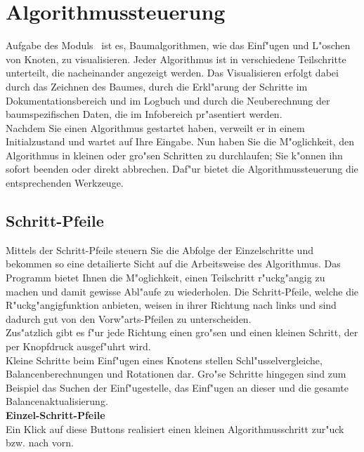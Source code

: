 
\section{Algorithmussteuerung}

Aufgabe des Moduls \AVL \ ist es, Baumalgorithmen, wie das Einf"ugen und L"oschen von Knoten, zu visualisieren.
Jeder Algorithmus ist in verschiedene Teilschritte unterteilt, die nacheinander angezeigt werden. Das Visualisieren
erfolgt dabei durch das Zeichnen des Baumes, durch die Erkl"arung der Schritte im Dokumentationsbereich und im Logbuch und durch die 
Neuberechnung der baumspezifischen Daten, die im Infobereich pr"asentiert werden.
\\
Nachdem Sie einen Algorithmus gestartet haben, verweilt er in einem Initialzustand und wartet auf Ihre Eingabe. 
Nun haben Sie die M"oglichkeit, den Algorithmus in kleinen oder gro"sen Schritten zu durchlaufen; Sie k"onnen ihn sofort
beenden oder direkt abbrechen. Daf"ur bietet die Algorithmussteuerung die entsprechenden Werkzeuge. \\


\subsection{Schritt-Pfeile}

Mittels der Schritt-Pfeile steuern Sie die Abfolge der Einzelschritte und bekommen so eine detailierte Sicht
auf die Arbeitsweise des Algorithmus. Das Programm bietet Ihnen die M"oglichkeit, einen Teilschritt r"uckg"angig 
zu machen und damit gewisse Abl"aufe zu wiederholen. Die Schritt-Pfeile, welche die R"uckg"angigfunktion anbieten, weisen
in ihrer Richtung nach links und sind dadurch gut von den Vorw"arts-Pfeilen zu unterscheiden. \\
Zus"atzlich gibt es f"ur jede Richtung einen gro"sen und einen kleinen Schritt, der per Knopfdruck ausgef"uhrt wird. \\

Kleine Schritte beim Einf"ugen eines Knotens stellen Schl"usselvergleiche, Balancenberechnungen und
Rotationen dar. Gro"se Schritte hingegen sind zum Beispiel das Suchen der Einf"ugestelle, das Einf"ugen an dieser und 
die gesamte Balancenaktualisierung. \\

\medskip
{} {\bf Einzel-Schritt-Pfeile} \\ 

Ein Klick auf diese Buttons realisiert einen kleinen Algorithmusschritt zur"uck bzw. nach vorn. \\


